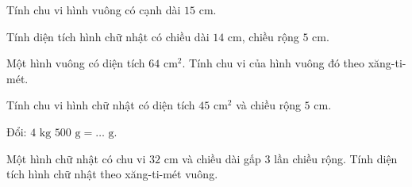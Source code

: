 \begin{ex} %
Tính chu vi hình vuông có cạnh dài $15\text{ cm}$.
\end{ex}

\begin{ex} %
Tính diện tích hình chữ nhật có chiều dài $14\text{ cm}$, chiều rộng $5\text{ cm}$.
\end{ex}

\begin{ex} %
Một hình vuông có diện tích $64\text{ cm}^2$. Tính chu vi của hình vuông đó theo xăng-ti-mét.
\end{ex}

\begin{ex} %
Tính chu vi hình chữ nhật có diện tích $45\text{ cm}^2$ và chiều rộng $5\text{ cm}$.
\end{ex}

\begin{ex} %
Đổi: $4\text{ kg } 500\text{ g} = \dots\text{ g}$.
\end{ex}

\begin{ex} %
Một hình chữ nhật có chu vi $32\text{ cm}$ và chiều dài gấp 3 lần chiều rộng. Tính diện tích hình chữ nhật theo xăng-ti-mét vuông.
\end{ex}
